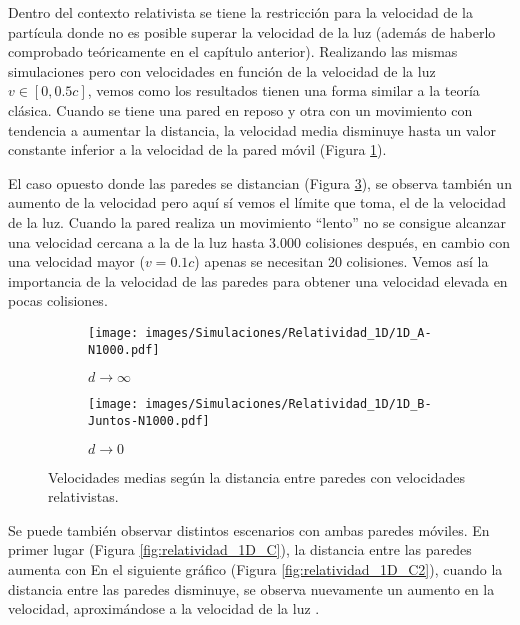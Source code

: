 Dentro del contexto relativista se tiene la restricción para la velocidad de la partícula donde no es posible superar la velocidad de la luz (además de haberlo comprobado teóricamente en el capítulo anterior). Realizando las mismas simulaciones pero con velocidades en función de la velocidad de la luz \( v \in [0, 0.5c] \), vemos como los resultados tienen una forma similar a la teoría clásica. Cuando se tiene una pared en reposo y otra con un movimiento con tendencia a aumentar la distancia, la velocidad media disminuye hasta un valor constante inferior a la velocidad de la pared móvil (Figura \ref{fig:relatividad_1D_A}). 

\vspace{3mm}

El caso opuesto donde las paredes se distancian (Figura \ref{fig:relatividad_1D_B}), se observa también un aumento de la velocidad pero aquí sí vemos el límite que toma, el de la velocidad de la luz. Cuando la pared realiza un movimiento ``lento'' no se consigue alcanzar una velocidad cercana a la de la luz hasta 3.000 colisiones después, en cambio con una velocidad mayor (\(v = 0.1c\)) apenas se necesitan 20 colisiones. Vemos así la importancia de la velocidad de las paredes para obtener una velocidad elevada en pocas colisiones.

\vspace{3mm}

\begin{figure}[H]
    \begin{subfigure}[b]{0.5\textwidth}
        \centering
        \texttt{[image: images/Simulaciones/Relatividad\_1D/1D\_A-N1000.pdf]}
        \caption{$d \rightarrow \infty$}
        \label{fig:relatividad_1D_A}
    \end{subfigure}
    \hfill
    \begin{subfigure}[b]{0.5\textwidth}
        \centering
        \texttt{[image: images/Simulaciones/Relatividad\_1D/1D\_B-Juntos-N1000.pdf]}
        \caption{$d \rightarrow 0$}
        \label{fig:relatividad_1D_B}
    \end{subfigure}
    \caption{Velocidades medias según la distancia entre paredes con velocidades relativistas.}
\end{figure}

Se puede también observar distintos escenarios con ambas paredes móviles. En primer lugar (Figura \ref{fig:relatividad_1D_C}), la distancia entre las paredes aumenta con  En el siguiente gráfico (Figura \ref{fig:relatividad_1D_C2}), cuando la distancia entre las paredes disminuye, se observa nuevamente un aumento en la velocidad, aproximándose a la velocidad de la luz . 


